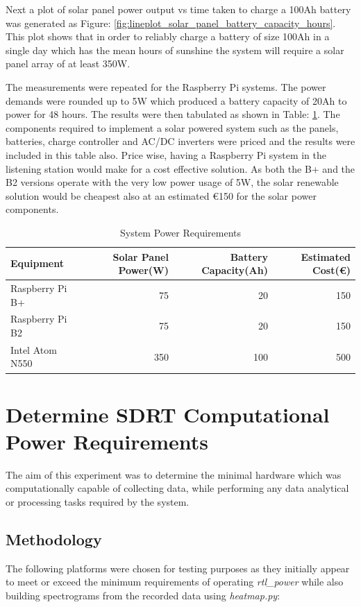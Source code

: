 Next a plot of solar panel power output vs time taken to charge a 100Ah battery was generated as Figure: \ref{fig:lineplot_solar_panel_battery_capacity_hours}. This plot shows that in order to reliably charge a battery of size 100Ah in a single day which has the mean hours of sunshine the system will require a solar panel array of at least 350W.

The measurements were repeated for the Raspberry Pi systems. The power demands were rounded up to 5W which produced a battery capacity of 20Ah to power for 48 hours. The results were then tabulated as shown in Table: \ref{tab:system_power_requirements}. The components required to implement a solar powered system such as the panels, batteries, charge controller and AC/DC inverters were priced and the results were included in this table also. Price wise, having a Raspberry Pi system in the listening station would make for a cost effective solution. As both the B+ and the B2 versions operate with the very low power usage of 5W, the solar renewable solution would be cheapest also at an estimated \euro 150 for the solar power components.

%
\begin{table}
	\centering
	\begin{tabular}{l r r r}
		\toprule
		Equipment & Solar Panel Power(W) & Battery Capacity(Ah) & Estimated Cost(\euro)\\ \midrule
		Raspberry Pi B+ & 75 & 20 & 150 \\
		Raspberry Pi B2 & 75 & 20 & 150 \\
		Intel Atom N550 & 350 & 100 & 500 \\
		\bottomrule
	\end{tabular}
	\caption{System Power Requirements}
	\label{tab:system_power_requirements}
\end{table}
%


\section*{Determine SDRT Computational Power Requirements}
The aim of this experiment was to determine the minimal hardware which was computationally capable of collecting data, while  performing any data analytical or processing tasks required by the system.


\subsection*{Methodology}
The following platforms were chosen for testing purposes as they initially appear to meet or exceed the minimum requirements of operating \textit{rtl\_power} while also building spectrograms from the recorded data using \textit{heatmap.py}:

